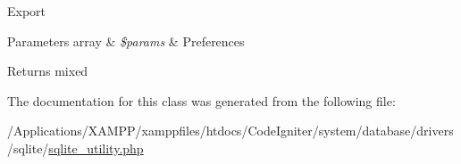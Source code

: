 Export


\begin{DoxyParams}[1]{Parameters}
array & {\em \$params} & Preferences \\
\hline
\end{DoxyParams}
\begin{DoxyReturn}{Returns}
mixed 
\end{DoxyReturn}


The documentation for this class was generated from the following file\+:\begin{DoxyCompactItemize}
\item 
/\+Applications/\+X\+A\+M\+P\+P/xamppfiles/htdocs/\+Code\+Igniter/system/database/drivers/sqlite/\mbox{\hyperlink{sqlite__utility_8php}{sqlite\+\_\+utility.\+php}}\end{DoxyCompactItemize}
